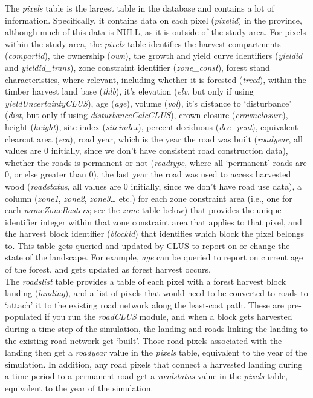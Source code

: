\documentclass[
]{article}
\begin{document}
The \emph{pixels} table is the largest table in the database and
contains a lot of information. Specifically, it contains data on each
pixel (\emph{pixelid}) in the province, although much of this data is
NULL, as it is outside of the study area. For pixels within the study
area, the \emph{pixels} table identifies the harvest compartments
(\emph{compartid}), the ownership (\emph{own}), the growth and yield
curve identifiers (\emph{yieldid} and \emph{yieldid\_trans}), zone
constraint identifier (\emph{zone\_const}), forest stand
characteristics, where relevant, including whether it is forested
(\emph{treed}), within the timber harvest land base (\emph{thlb}), it's
elevation (\emph{elv}, but only if using \emph{yieldUncertaintyCLUS}),
age (\emph{age}), volume (\emph{vol}), it's distance to `disturbance'
(\emph{dist}, but only if using \emph{disturbanceCalcCLUS}), crown
closure (\emph{crownclosure}), height (\emph{height}), site index
(\emph{siteindex}), percent deciduous (\emph{dec\_pcnt}), equivalent
clearcut area (\emph{eca}), road year, which is the year the road was
built (\emph{roadyear}, all values are 0 initially, since we don't have
consistent road construction data), whether the roads is permanent or
not (\emph{roadtype}, where all `permanent' roads are 0, or else greater
than 0), the last year the road was used to access harvested wood
(\emph{roadstatus}, all values are 0 initially, since we don't have road
use data), a column (\emph{zone1}, \emph{zone2}, \emph{zone3}\ldots{}
etc.) for each zone constraint area (i.e., one for each
\emph{nameZoneRasters}; see the \emph{zone} table below) that provides
the unique identifier integer within that zone constraint area that
applies to that pixel, and the harvest block identifier (\emph{blockid})
that identifies which block the pixel belongs to. This table gets
queried and updated by CLUS to report on or change the state of the
landscape. For example, \emph{age} can be queried to report on current
age of the forest, and gets updated as forest harvest occurs.\\
The \emph{roadslist} table provides a table of each pixel with a forest
harvest block landing (\emph{landing}), and a list of pixels that would
need to be converted to roads to `attach' it to the existing road
network along the least-cost path. These are pre-populated if you run
the \emph{roadCLUS} module, and when a block gets harvested during a
time step of the simulation, the landing and roads linking the landing
to the existing road network get `built'. Those road pixels associated
with the landing then get a \emph{roadyear} value in the \emph{pixels}
table, equivalent to the year of the simulation. In addition, any road
pixels that connect a harvested landing during a time period to a
permanent road get a \emph{roadstatus} value in the \emph{pixels} table,
equivalent to the year of the simulation.
\end{document}

